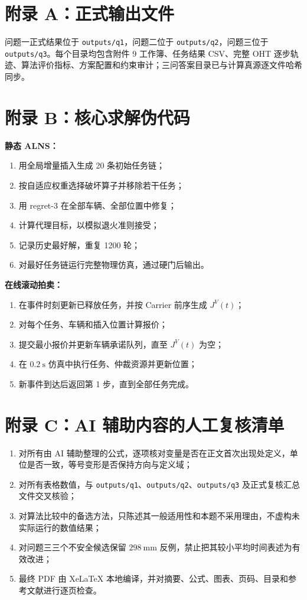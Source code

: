 \documentclass[UTF8]{ctexart}
\begin{document}
\newpage
\appendix
\section*{附录 A：正式输出文件}

问题一正式结果位于 \verb|outputs/q1|，问题二位于 \verb|outputs/q2|，问题三位于 \verb|outputs/q3|。每个目录均包含附件 9 工作簿、任务结果 CSV、完整 OHT 逐步轨迹、算法评价指标、方案配置和约束审计；三问答案目录已与计算真源逐文件哈希同步。

\section*{附录 B：核心求解伪代码}

\noindent\textbf{静态 ALNS：}
\begin{enumerate}
\item 用全局增量插入生成 20 条初始任务链；
\item 按自适应权重选择破坏算子并移除若干任务；
\item 用 regret-3 在全部车辆、全部位置中修复；
\item 计算代理目标，以模拟退火准则接受；
\item 记录历史最好解，重复 1200 轮；
\item 对最好任务链运行完整物理仿真，通过硬门后输出。
\end{enumerate}

\noindent\textbf{在线滚动拍卖：}
\begin{enumerate}
\item 在事件时刻更新已释放任务，并按 Carrier 前序生成 $J^V(t)$；
\item 对每个任务、车辆和插入位置计算报价；
\item 提交最小报价并更新车辆承诺队列，直至 $J^V(t)$ 为空；
\item 在 $0.2\ \mathrm{s}$ 仿真中执行任务、仲裁资源并更新位置；
\item 新事件到达后返回第 1 步，直到全部任务完成。
\end{enumerate}

\section*{附录 C：AI 辅助内容的人工复核清单}

\begin{enumerate}
\item 对所有由 AI 辅助整理的公式，逐项核对变量是否在正文首次出现处定义，单位是否一致，等号变形是否保持方向与定义域；
\item 对所有表格数值，与 \verb|outputs/q1|、\verb|outputs/q2|、\verb|outputs/q3| 及正式复核汇总文件交叉核验；
\item 对算法比较中的备选方法，只陈述其一般适用性和本题不采用理由，不虚构未实际运行的数值结果；
\item 对问题三三个不安全候选保留 $298\ \mathrm{mm}$ 反例，禁止把其较小平均时间表述为有效改进；
\item 最终 PDF 由 XeLaTeX 本地编译，并对摘要、公式、图表、页码、目录和参考文献进行逐页检查。
\end{enumerate}
\end{document}

